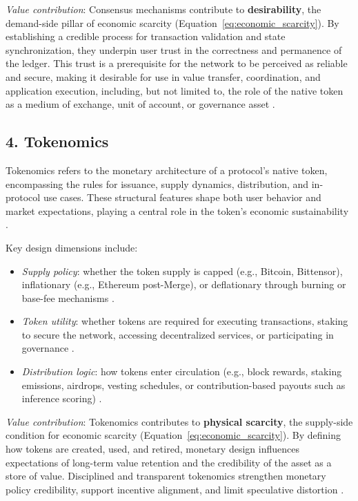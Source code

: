 \documentclass[12pt]{article}
\begin{document}
\textit{Value contribution}: Consensus mechanisms contribute to \textbf{desirability}, the demand-side pillar of economic scarcity (Equation~\ref{eq:economic_scarcity}). By establishing a credible process for transaction validation and state synchronization, they underpin user trust in the correctness and permanence of the ledger. This trust is a prerequisite for the network to be perceived as reliable and secure, making it desirable for use in value transfer, coordination, and application execution, including, but not limited to, the role of the native token as a medium of exchange, unit of account, or governance asset \citep{catalini2020some, urquhart2022ethereum}.

\subsection*{4. Tokenomics}

Tokenomics refers to the monetary architecture of a protocol’s native token, encompassing the rules for issuance, supply dynamics, distribution, and in-protocol use cases. These structural features shape both user behavior and market expectations, playing a central role in the token’s economic sustainability \citep{cong2021tokenomics, catalini2020some}.

Key design dimensions include:

\begin{itemize}
    \item \textit{Supply policy}: whether the token supply is capped (e.g., Bitcoin, Bittensor), inflationary (e.g., Ethereum post-Merge), or deflationary through burning or base-fee mechanisms \citep{nakamoto2008bitcoin, rao2023bittensor, buterin2022proof}.

    \item \textit{Token utility}: whether tokens are required for executing transactions, staking to secure the network, accessing decentralized services, or participating in governance \citep{buterin2022proof, catalini2020some, urquhart2022ethereum}.

    \item \textit{Distribution logic}: how tokens enter circulation (e.g., block rewards, staking emissions, airdrops, vesting schedules, or contribution-based payouts such as inference scoring) \citep{gans2019economics, cong2021tokenomics, rao2023bittensor}.
\end{itemize}

\textit{Value contribution}: Tokenomics contributes to \textbf{physical scarcity}, the supply-side condition for economic scarcity (Equation~\ref{eq:economic_scarcity}). By defining how tokens are created, used, and retired, monetary design influences expectations of long-term value retention and the credibility of the asset as a store of value. Disciplined and transparent tokenomics strengthen monetary policy credibility, support incentive alignment, and limit speculative distortion \citep{gans2019economics, huberman2021monetizing}.
\end{document}
